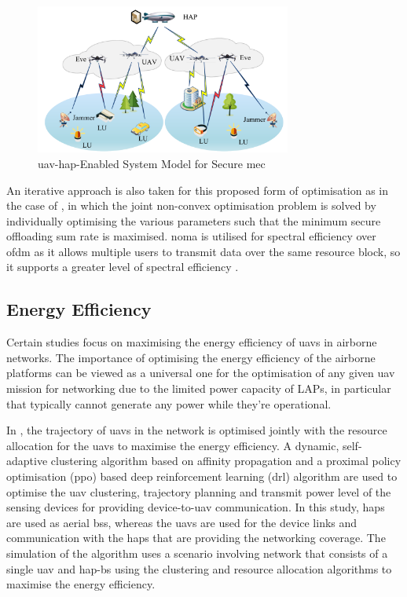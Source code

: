 \begin{figure}[ht!]
    \centering
    \includegraphics[width=0.75\textwidth]{figures/uav_hap_secrecy_qin.png}
    \caption{\acrshort{uav}-\acrshort{hap}-Enabled System Model for Secure \acrshort{mec}}
    \label{fig:qin_uav_hap_mec_system_model}
\end{figure}

An iterative approach is also taken for this proposed form of optimisation as in the case of \cite{zhang_one_2025}, in which the joint non-convex optimisation problem is solved by individually optimising the various parameters such that the minimum secure offloading sum rate is maximised. 
\acrshort{noma} is utilised for spectral efficiency over \acrshort{ofdm} as it allows multiple users to transmit data over the same resource block, so it supports a greater level of spectral efficiency \cite{qin_secure_2023}. 

\subsection{Energy Efficiency}
Certain studies \cite{silvirianti_energy-efficient_2022, silvirianti_layerwise_2024, zhao_energy_2023, zhang_energy-efficient_2024} focus on maximising the energy efficiency of \acrshort{uav}s in airborne networks. The importance of optimising the energy efficiency of the airborne platforms can be viewed as a universal one for the optimisation of any given \acrshort{uav} mission for networking due to the limited power capacity of LAPs, in particular that typically cannot generate any power while they're operational. 

In \cite{zhao_energy_2023}, the trajectory of \acrshort{uav}s in the network is optimised jointly with the resource allocation for the \acrshort{uav}s to maximise the energy efficiency. 
A dynamic, self-adaptive clustering algorithm based on affinity propagation and a proximal policy optimisation (\acrshort{ppo}) based deep reinforcement learning (\acrshort{drl}) algorithm are used to optimise the \acrshort{uav} clustering, trajectory planning and transmit power level of the sensing devices for providing device-to-\acrshort{uav} communication. 
In this study, \acrshort{hap}s are used as aerial \acrshort{bs}s, whereas the \acrshort{uav}s are used for the device links and communication with the \acrshort{hap}s that are providing the networking coverage. 
The simulation of the algorithm uses a scenario involving network that consists of a single \acrshort{uav} and \acrshort{hap}-\acrshort{bs} using the clustering and resource allocation algorithms to maximise the energy efficiency. 

